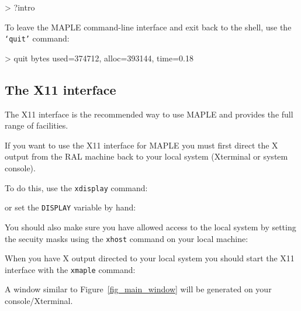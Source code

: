 \documentclass[twoside,11pt]{starlink}
\begin{document}
\begin{terminalv}
> ?intro
\end{terminalv}

To leave the MAPLE command-line interface and exit back to the shell,
use the \texttt{`quit'} command:

\begin{terminalv}
> quit
bytes used=374712, alloc=393144, time=0.18
%
\end{terminalv}

\subsection{The X11 interface}

The X11 interface is the recommended way to use MAPLE and provides the full
range of facilities.

If you want to use the X11 interface for MAPLE you must first direct
the X output from the RAL machine back to your local system (Xterminal or
system console).

To do this, use the \texttt{xdisplay} command:

\begin{terminalv}
\end{terminalv}

or set the \texttt{DISPLAY} variable by hand:

\begin{terminalv}
\end{terminalv}

You should also make sure you have allowed access to the local system by
setting the secuity masks using the \texttt{xhost} command on your local
machine:

\begin{terminalv}
\end{terminalv}

When you have X output directed to your local system you should start the
X11 interface with the \texttt{xmaple} command:

\begin{terminalv}
\end{terminalv}

A window similar to Figure~\ref{fig_main_window} will be generated on your
console/Xterminal.
\end{document}

